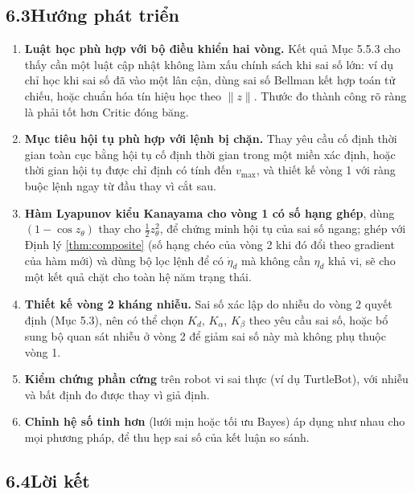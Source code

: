\documentclass[12pt,a4paper]{article}
\begin{document}
\subsection*{6.3\quad Hướng phát triển}

\begin{enumerate}
    \item \textbf{Luật học phù hợp với bộ điều khiển hai vòng.} Kết quả Mục 5.5.3 cho thấy cần một luật cập nhật không làm xấu chính sách khi sai số lớn: ví dụ chỉ học khi sai số đã vào một lân cận, dùng sai số Bellman kết hợp toán tử chiếu, hoặc chuẩn hóa tín hiệu học theo $\|z\|$. Thước đo thành công rõ ràng là phải tốt hơn Critic đóng băng.

    \item \textbf{Mục tiêu hội tụ phù hợp với lệnh bị chặn.} Thay yêu cầu cố định thời gian toàn cục bằng hội tụ cố định thời gian trong một miền xác định, hoặc thời gian hội tụ được chỉ định có tính đến $v_{\max}$, và thiết kế vòng 1 với ràng buộc lệnh ngay từ đầu thay vì cắt sau.

    \item \textbf{Hàm Lyapunov kiểu Kanayama cho vòng 1 có số hạng ghép}, dùng $(1 - \cos z_\theta)$ thay cho $\frac12 z_\theta^2$, để chứng minh hội tụ của sai số ngang; ghép với Định lý \ref{thm:composite} (số hạng chéo của vòng 2 khi đó đổi theo gradient của hàm mới) và dùng bộ lọc lệnh \cite{Farrell2009} để có $\dot\eta_d$ mà không cần $\eta_d$ khả vi, sẽ cho một kết quả chặt cho toàn hệ năm trạng thái.

    \item \textbf{Thiết kế vòng 2 kháng nhiễu.} Sai số xác lập do nhiễu do vòng 2 quyết định (Mục 5.3), nên có thể chọn $K_d$, $K_\alpha$, $K_\beta$ theo yêu cầu sai số, hoặc bổ sung bộ quan sát nhiễu ở vòng 2 để giảm sai số này mà không phụ thuộc vòng 1.

    \item \textbf{Kiểm chứng phần cứng} trên robot vi sai thực (ví dụ TurtleBot), với nhiễu và bất định đo được thay vì giả định.

    \item \textbf{Chỉnh hệ số tinh hơn} (lưới mịn hoặc tối ưu Bayes) áp dụng như nhau cho mọi phương pháp, để thu hẹp sai số của kết luận so sánh.
\end{enumerate}

\subsection*{6.4\quad Lời kết}
\end{document}
